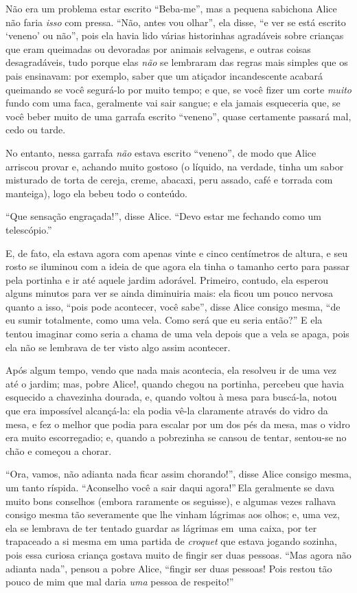 Não era um problema estar escrito ``Beba-me'', mas a pequena sabichona
Alice não faria \emph{isso} com pressa. ``Não, antes vou olhar'', ela
disse, ``e ver se está escrito `veneno' ou não'', pois ela havia lido
várias historinhas agradáveis sobre crianças que eram queimadas ou
devoradas por animais selvagens, e outras coisas desagradáveis, tudo
porque elas \emph{não} se lembraram das regras mais simples que os pais
ensinavam: por exemplo, saber que um atiçador incandescente
acabará queimando se você segurá-lo por muito tempo; e que, se você
fizer um corte \emph{muito} fundo com uma faca, geralmente vai sair
sangue; e ela jamais esqueceria que, se você beber muito de uma garrafa
escrito ``veneno'', quase certamente passará mal, cedo ou tarde.

No entanto, nessa garrafa \emph{não} estava escrito ``veneno'', de modo
que Alice arriscou provar e, achando muito gostoso (o líquido, na
verdade, tinha um sabor misturado de torta de cereja, creme, abacaxi,
peru assado, café e torrada com manteiga), logo ela bebeu todo o
conteúdo.

``Que sensação engraçada!'', disse Alice. ``Devo estar me fechando como
um telescópio.''

E, de fato, ela estava agora com apenas vinte e cinco
centímetros de altura, e seu rosto se iluminou com a ideia de que agora
ela tinha o tamanho certo para passar pela portinha e ir até aquele
jardim adorável. Primeiro, contudo, ela esperou alguns minutos para
ver se ainda diminuiria mais: ela ficou um pouco nervosa quanto a isso,
``pois pode acontecer, você sabe'', disse Alice consigo mesma, ``de eu
sumir totalmente, como uma vela. Como será que eu seria então?'' E ela
tentou imaginar como seria a chama de uma vela depois que a vela se
apaga, pois ela não se lembrava de ter visto algo assim acontecer.

Após algum tempo, vendo que nada mais acontecia, ela resolveu ir de uma
vez até o jardim; mas, pobre Alice!, quando chegou na portinha, percebeu
que havia esquecido a chavezinha dourada, e, quando voltou à mesa para
buscá-la, notou que era impossível alcançá-la: ela podia vê-la
claramente através do vidro da mesa, e fez o melhor que podia para
escalar por um dos pés da mesa, mas o vidro era muito escorregadio; e,
quando a pobrezinha se cansou de tentar, sentou-se no chão e começou a
chorar.

``Ora, vamos, não adianta nada ficar assim chorando!'', disse Alice
consigo mesma, um tanto ríspida. ``Aconselho você a sair daqui agora!''\,Ela geralmente se dava muito bons conselhos (embora raramente os
seguisse), e algumas vezes ralhava consigo mesma tão severamente que lhe
vinham lágrimas aos olhos; e, uma vez, ela se lembrava de ter tentado
guardar as lágrimas em~uma caixa, por ter trapaceado a si mesma em uma
partida de \textit{croquet} que estava jogando sozinha, pois essa curiosa criança
gostava muito de fingir ser duas pessoas. ``Mas agora não adianta
nada'', pensou a pobre Alice, ``fingir ser duas pessoas! Pois restou tão
pouco de mim que mal daria \emph{uma} pessoa de respeito!''

